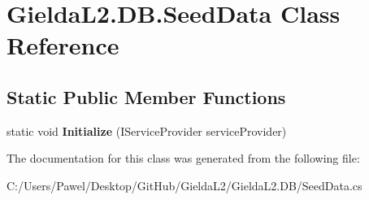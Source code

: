 \hypertarget{class_gielda_l2_1_1_d_b_1_1_seed_data}{}\section{Gielda\+L2.\+D\+B.\+Seed\+Data Class Reference}
\label{class_gielda_l2_1_1_d_b_1_1_seed_data}
\subsection*{Static Public Member Functions}
\begin{DoxyCompactItemize}
\item 
\mbox{\label{class_gielda_l2_1_1_d_b_1_1_seed_data_ab4c603057c8d66e5afb0b1874daef742}} 
static void {\bfseries Initialize} (I\+Service\+Provider service\+Provider)
\end{DoxyCompactItemize}


The documentation for this class was generated from the following file\+:\begin{DoxyCompactItemize}
\item 
C\+:/\+Users/\+Pawel/\+Desktop/\+Git\+Hub/\+Gielda\+L2/\+Gielda\+L2.\+D\+B/Seed\+Data.\+cs\end{DoxyCompactItemize}
